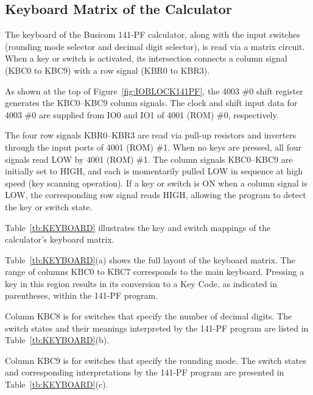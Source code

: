 \subsection{Keyboard Matrix of the Calculator}
The keyboard of the Busicom 141-PF calculator, along with the input switches (rounding mode selector and decimal digit selector), is read via a matrix circuit. When a key or switch is activated, its intersection connects a column signal (KBC0 to KBC9) with a row signal (KBR0 to KBR3).

As shown at the top of Figure~\ref{fig:IOBLOCK141PF}, the 4003 \#0 shift register generates the KBC0–KBC9 column signals. The clock and shift input data for 4003 \#0 are supplied from IO0 and IO1 of 4001 (ROM) \#0, respectively.

The four row signals KBR0–KBR3 are read via pull-up resistors and inverters through the input ports of 4001 (ROM) \#1. When no keys are pressed, all four signals read LOW by 4001 (ROM) \#1. The column signals KBC0–KBC9 are initially set to HIGH, and each is momentarily pulled LOW in sequence at high speed (key scanning operation). If a key or switch is ON when a column signal is LOW, the corresponding row signal reads HIGH, allowing the program to detect the key or switch state.

Table~\ref{tb:KEYBOARD} illustrates the key and switch mappings of the calculator's keyboard matrix.

Table~\ref{tb:KEYBOARD}(a) shows the full layout of the keyboard matrix. The range of columns KBC0 to KBC7 corresponds to the main keyboard. Pressing a key in this region results in its conversion to a Key Code, as indicated in parentheses, within the 141-PF program.

Column KBC8 is for switches that specify the number of decimal digits. The switch states and their meanings interpreted by the 141-PF program are listed in Table~\ref{tb:KEYBOARD}(b).

Column KBC9 is for switches that specify the rounding mode. The switch states and corresponding interpretations by the 141-PF program are presented in Table~\ref{tb:KEYBOARD}(c).

